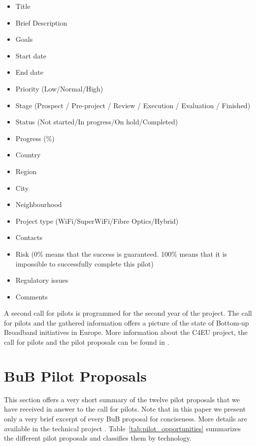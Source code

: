 \documentclass[conference]{IEEEtran}
\begin{document}
\begin{itemize}
  \item Title
  \item Brief Description
  \item Goals
  \item Start date
  \item End date
  \item Priority (Low/Normal/High)
  \item Stage 
  (Prospect / Pre-project / Review / Execution / Evaluation / Finished)
  \item Status (Not started/In progress/On hold/Completed)
  \item Progress (\%)
  \item Country
  \item Region
  \item City
  \item Neighbourhood
  \item Project type (WiFi/SuperWiFi/Fibre Optics/Hybrid)
  \item Contacts
  \item Risk (0\% means that the success is guaranteed. 100\% means that it is impossible to successfully complete this pilot)
  \item Regulatory issues
  \item Comments
\end{itemize}

A second call for pilots is programmed for the second year of the project. 
The call for pilots and the gathered information offers a picture of the state of Bottom-up Broadband initiatives in Europe.
More information about the C4EU project, the call for pilots and the pilot proposals can be found in \cite{barcelo2012bpp}.

\section{BuB Pilot Proposals}
This section offers a very short summary of the twelve pilot proposals that we have received in answer to the call for pilots.
Note that in this paper we present only a very brief excerpt of every BuB proposal for conciseness. 
More details are available in the technical project \cite{barcelo2012bpp}.
Table~\ref{tab:pilot_opportunities} summarizes the different pilot proposals and classifies them by technology.
\end{document}
